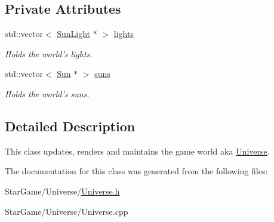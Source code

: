 \subsection*{Private Attributes}
\begin{DoxyCompactItemize}
\item 
\hypertarget{class_universe_afa686fcb7a6c92e7ef41b1eceec8e5be}{std\-::vector$<$ \hyperlink{class_sun_light}{Sun\-Light} $\ast$ $>$ \hyperlink{class_universe_afa686fcb7a6c92e7ef41b1eceec8e5be}{lights}}\label{class_universe_afa686fcb7a6c92e7ef41b1eceec8e5be}

\begin{DoxyCompactList}\small\item\em Holds the world's lights. \end{DoxyCompactList}\item 
\hypertarget{class_universe_ad0502cbfe6e9373fd29aaf70fb5133a0}{std\-::vector$<$ \hyperlink{class_sun}{Sun} $\ast$ $>$ \hyperlink{class_universe_ad0502cbfe6e9373fd29aaf70fb5133a0}{suns}}\label{class_universe_ad0502cbfe6e9373fd29aaf70fb5133a0}

\begin{DoxyCompactList}\small\item\em Holds the world's suns. \end{DoxyCompactList}\end{DoxyCompactItemize}


\subsection{Detailed Description}
This class updates, renders and maintains the game world aka \hyperlink{class_universe}{Universe}. 

The documentation for this class was generated from the following files\-:\begin{DoxyCompactItemize}
\item 
Star\-Game/\-Universe/\hyperlink{_universe_8h}{Universe.\-h}\item 
Star\-Game/\-Universe/Universe.\-cpp\end{DoxyCompactItemize}
